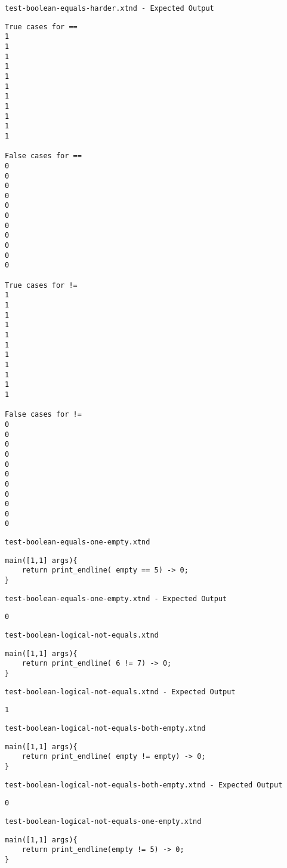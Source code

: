 \medskip \noindent \texttt{test-boolean-equals-harder.xtnd - Expected Output}


\begin{lstlisting}
True cases for ==
1
1
1
1
1
1
1
1
1
1
1

False cases for ==
0
0
0
0
0
0
0
0
0
0
0

True cases for !=
1
1
1
1
1
1
1
1
1
1
1

False cases for !=
0
0
0
0
0
0
0
0
0
0
0
\end{lstlisting}


\medskip \noindent \texttt{test-boolean-equals-one-empty.xtnd}


\begin{lstlisting}
main([1,1] args){
	return print_endline( empty == 5) -> 0;
}
\end{lstlisting}


\medskip \noindent \texttt{test-boolean-equals-one-empty.xtnd - Expected Output}


\begin{lstlisting}
0
\end{lstlisting}


\medskip \noindent \texttt{test-boolean-logical-not-equals.xtnd}


\begin{lstlisting}
main([1,1] args){
	return print_endline( 6 != 7) -> 0;
}
\end{lstlisting}


\medskip \noindent \texttt{test-boolean-logical-not-equals.xtnd - Expected Output}


\begin{lstlisting}
1
\end{lstlisting}


\medskip \noindent \texttt{test-boolean-logical-not-equals-both-empty.xtnd}


\begin{lstlisting}
main([1,1] args){
	return print_endline( empty != empty) -> 0;
}
\end{lstlisting}


\medskip \noindent \texttt{test-boolean-logical-not-equals-both-empty.xtnd - Expected Output}


\begin{lstlisting}
0
\end{lstlisting}


\medskip \noindent \texttt{test-boolean-logical-not-equals-one-empty.xtnd}


\begin{lstlisting}
main([1,1] args){
	return print_endline(empty != 5) -> 0;
}
\end{lstlisting}


